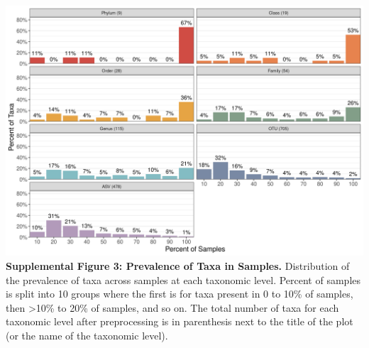 \documentclass[
]{article}
\begin{document}
\newpage

\includegraphics[width=\textwidth,height=0.45\textheight]{figure_s3.png}\\
\textbf{Supplemental Figure 3: Prevalence of Taxa in Samples.}
Distribution of the prevalence of taxa across samples at each taxonomic
level. Percent of samples is split into 10 groups where the first is for
taxa present in 0 to 10\% of samples, then \textgreater10\% to 20\% of
samples, and so on. The total number of taxa for each taxonomic level
after preprocessing is in parenthesis next to the title of the plot (or
the name of the taxonomic level).

\newpage
\end{document}
